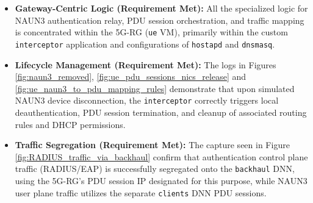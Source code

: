 \begin{itemize}
    \item \textbf{Gateway-Centric Logic (Requirement Met):} All the specialized logic for \ac{NAUN3} authentication relay, \ac{PDU} session orchestration, and traffic mapping is concentrated within the \ac{5G-RG} (\texttt{ue} \ac{VM}), primarily within the custom \texttt{interceptor} application and configurations of \texttt{hostapd} and \texttt{dnsmasq}.

    \item \textbf{Lifecycle Management (Requirement Met):} The logs in Figures \ref{fig:naun3_removed}, \ref{fig:ue_pdu_sessions_nics_release} and \ref{fig:ue_naun3_to_pdu_mapping_rules} demonstrate that upon simulated \ac{NAUN3} device disconnection, the \texttt{interceptor} correctly triggers local deauthentication, \ac{PDU} session termination, and cleanup of associated routing rules and \ac{DHCP} permissions.

    \item \textbf{Traffic Segregation (Requirement Met):} The capture seen in Figure \ref{fig:RADIUS_traffic_via_backhaul} confirm that authentication control plane traffic (\ac{RADIUS}/\ac{EAP}) is successfully segregated onto the \texttt{backhaul} \ac{DNN}, using the \ac{5G-RG}'s \ac{PDU} session \ac{IP} designated for this purpose, while \ac{NAUN3} user plane traffic utilizes the separate \texttt{clients} \ac{DNN} \ac{PDU} sessions.
\end{itemize}